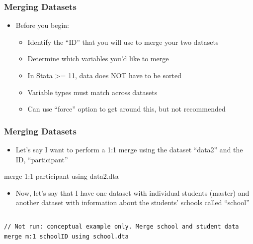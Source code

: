 \documentclass[table]{beamer}
\begin{document}
\begin{frame}
\frametitle{Merging Datasets}
\label{sec-6-4}

\begin{itemize}
\item Before you begin:
\begin{itemize}
\item Identify the ``ID'' that you will use to merge your two datasets
\item Determine which variables you'd like to merge
\item In Stata >= 11, data does NOT have to be sorted
\item Variable types must match across datasets
\item Can use ``force'' option to get around this, but not recommended
\end{itemize}
\end{itemize}
\end{frame}
\begin{frame}[fragile]
\frametitle{Merging Datasets}
\label{sec-6-5}

\begin{itemize}
\item Let's say I want to perform a 1:1 merge using
  the dataset ``data2'' and the ID, ``participant''
\end{itemize}
merge 1:1 participant using data2.dta
\begin{itemize}
\item Now, let's say that I have one dataset with
  individual students (master) and another
  dataset with information about the students'
  schools called ``school''
\end{itemize}

\vspace{-.5em} \begin{columns}  \begin{block}{}

\begin{verbatim}
// Not run: conceptual example only. Merge school and student data
merge m:1 schoolID using school.dta
\end{verbatim}
\end{block} \end{columns}
\end{frame}
\end{document}
